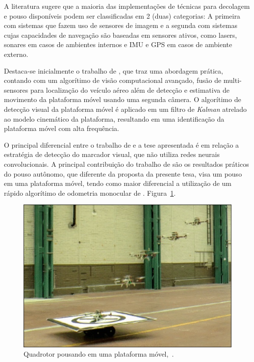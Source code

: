    A literatura sugere que a maioria das implementações de técnicas para decolagem e pouso disponíveis podem ser classificadas em 2 (duas) categorias: A primeira com sistemas que fazem uso de sensores de imagem e a segunda com sistemas cujas capacidades de navegação são baseadas em sensores ativos, como lasers, sonares em casos de ambientes internos e IMU e GPS em casos de ambiente externo.
    
    Destaca-se inicialmente o trabalho de \citet{Falanga2017}, que traz uma abordagem prática, contando com um algorítimo de visão computacional avançado, fusão de multi-sensores para localização do veículo aéreo além de detecção e estimativa de movimento da plataforma móvel usando uma segunda câmera. O algorítimo de detecção visual da plataforma móvel é aplicado em um filtro de \textit{Kalman} atrelado ao modelo cinemático da plataforma, resultando em uma identificação da plataforma móvel com alta frequência.
    
    O principal diferencial entre o trabalho de \citet{Falanga2017} e a tese apresentada é em relação a estratégia de detecção do marcador visual, que não utiliza redes neurais convolucionais. A principal contribuição do trabalho de \citet{Falanga2017} são os resultados práticos do pouso autônomo, que diferente da proposta da presente tesa, visa um pouso em uma plataforma móvel, tendo como maior diferencial a utilização de um rápido algorítimo de odometria monocular de \cite{Forster2014}. Figura~\ref{fig:estadolanding}.
    
    \begin{figure}[H]
    	\centering
    	\includegraphics[scale=1.1]{figuras/landing.jpg}
    	\caption{Quadrotor pousando em uma plataforma móvel,~\cite{Falanga2017}.}
    	\label{fig:estadolanding}
    \end{figure}
    

